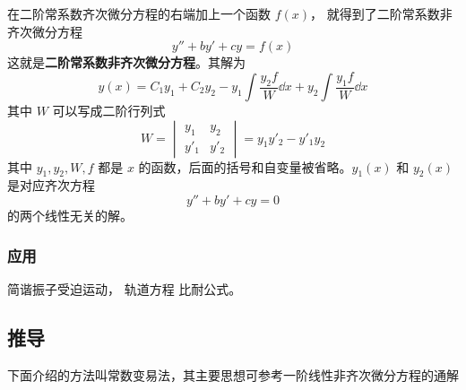 


在二阶常系数齐次微分方程的右端加上一个函数 $f(x)$， 就得到了二阶常系数非齐次微分方程
\begin{equation}\label{eq_Ode2N_1}
y'' + by' + cy = f(x)
\end{equation}
这就是\textbf{二阶常系数非齐次微分方程}。其解为
\begin{equation}
y(x) = C_1 y_1 + C_2 y_2 - y_1\int \frac{y_2 f}{W} \dd{x} + y_2\int \frac{y_1 f}{W} \dd{x}
\end{equation}
其中 $W$ 可以写成二阶行列式
\begin{equation}
W = 
\begin{vmatrix}
y_1 & y_2\\
y'_1 & y'_2
\end{vmatrix} = y_1 y'_2 - y'_1 y_2
\end{equation}
其中 $y_1, y_2, W, f$ 都是 $x$ 的函数，后面的括号和自变量被省略。$y_1(x)$ 和 $y_2(x)$ 是对应齐次方程 
\begin{equation}\label{eq_Ode2N_4}
y'' + by' + cy = 0
\end{equation}
的两个线性无关的解。

\subsubsection{应用}
简谐振子受迫运动， 轨道方程 比耐公式。

\subsection{推导}

下面介绍的方法叫常数变易法，其主要思想可参考一阶线性非齐次微分方程的通解%

